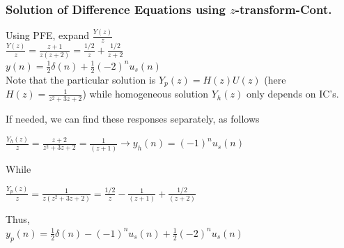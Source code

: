 \documentclass[mathserif, 10pt]{beamer} %
\begin{document}
\frame
{

\normalsize

\frametitle{Solution of Difference Equations using $z$-transform-Cont.}

Using PFE, expand $\frac{Y(z)}{z}$\\ \vspace{.1in}
$\frac{Y(z)}{z} = \frac{z+1}{z(z+2)} = \frac{1/2}{z}+\frac{1/2}{z+2}$\\ \vspace{.1in}
$y(n) = \frac{1}{2} \delta(n) +\frac{1}{2} (-2)^nu_s(n)$\\

Note that the particular solution is $Y_p(z)= H(z)U(z)$ (here $H(z)=\frac{1}{z^2+3z+2}$) while homogeneous solution $Y_h(z)$ only depends on IC's. \\ \vspace{.1in}

If needed, we can find these responses separately, as follows

$\frac{Y_{h}(z)}{z}= \frac{z+2}{z^2+3z+2}=\frac{1}{(z+1)} \longrightarrow y_h(n)= (-1)^n u_s(n)$ \\ \vspace{.1in}

While 

$\frac{Y_{p}(z)}{z}= \frac{1}{z(z^2+3z+2)}=\frac{1/2}{z}-\frac{1}{(z+1)}+\frac{1/2}{(z+2)}$ \\ \vspace{.1in}

Thus, \\
 $y_p(n)= \frac{1}{2} \delta(n) -(-1)^n u_s(n)+\frac{1}{2} (-2)^nu_s(n)$ \\ \vspace{.1in}

}
\end{document}
